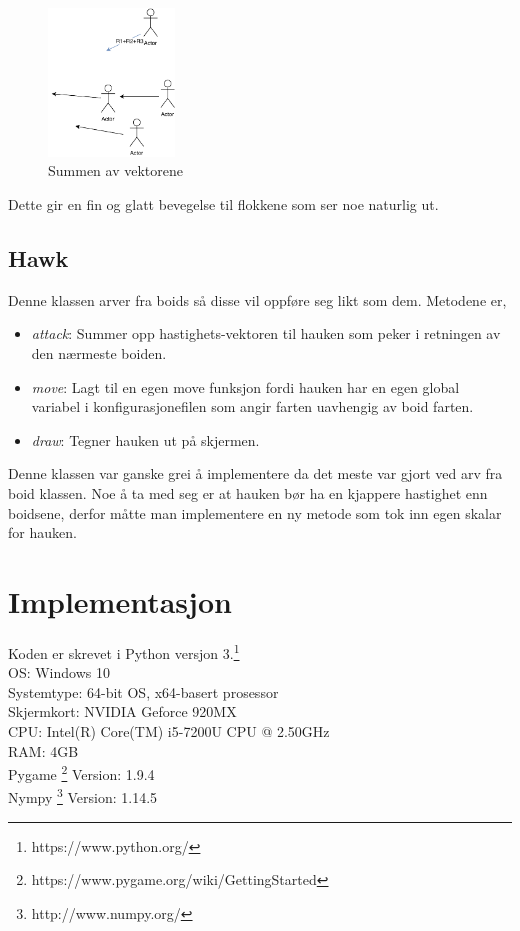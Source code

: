 {\begin{figure}[hbt!]
{\centering
    \includegraphics[width=0.30\textwidth]{rulelast.pdf}
    \caption{Summen av vektorene}
    \label{sumvektor}
\par}
\end{figure}

Dette gir en fin og glatt bevegelse til flokkene som ser noe naturlig ut.


\subsection{Hawk}

Denne klassen arver fra boids så disse vil oppføre seg likt som dem. Metodene er,

\begin{itemize}
    \item \emph{attack}: Summer opp hastighets-vektoren til hauken som peker i retningen av den nærmeste boiden.
    \item \emph{move}: Lagt til en egen move funksjon fordi hauken har en egen global variabel i konfigurasjonefilen som angir farten uavhengig av boid farten.
    \item \emph{draw}: Tegner hauken ut på skjermen.
\end{itemize}


Denne klassen var ganske grei å implementere da det meste var gjort ved arv fra boid klassen.
Noe å ta med seg er at hauken bør ha en kjappere hastighet enn boidsene, derfor måtte man implementere en ny metode som tok inn egen skalar for hauken.



\section{Implementasjon}
Koden er skrevet i Python versjon 3.\footnote{https://www.python.org/}\\
OS: Windows 10\\
Systemtype: 64-bit OS, x64-basert prosessor\\
Skjermkort: NVIDIA Geforce 920MX\\
CPU: Intel(R) Core(TM) i5-7200U CPU @ 2.50GHz\\
RAM: 4GB\\
Pygame \footnote{https://www.pygame.org/wiki/GettingStarted} Version: 1.9.4\\
Nympy \footnote{http://www.numpy.org/} Version: 1.14.5\\


}
